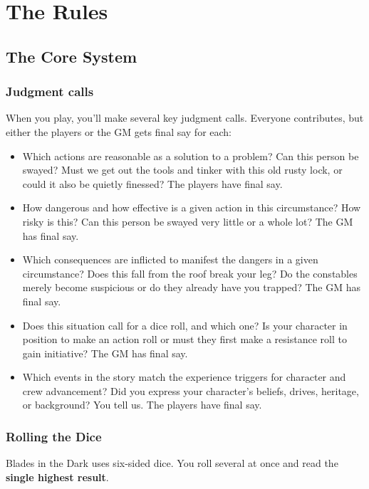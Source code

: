 \chapter{The Rules}

\section{The Core System}

\subsection{Judgment calls}

When you play, you’ll make several key judgment calls. Everyone contributes, but either the players or the GM gets final say for each:

\begin{itemize}
\item Which actions are reasonable as a solution to a problem? Can this person be swayed? Must we get out the tools and tinker with this old rusty lock, or could it also be quietly finessed? The players have final say.
\item How dangerous and how effective is a given action in this circumstance? How risky is this? Can this person be swayed very little or a whole lot? The GM has final say.
\item Which consequences are inflicted to manifest the dangers in a given circumstance? Does this fall from the roof break your leg? Do the constables merely become suspicious or do they already have you trapped? The GM has final say.
\item Does this situation call for a dice roll, and which one? Is your character in position to make an action roll or must they first make a resistance roll to gain initiative? The GM has final say.
\item Which events in the story match the experience triggers for character and crew advancement? Did you express your character’s beliefs, drives, heritage, or background? You tell us. The players have final say.
\end{itemize}

\subsection{Rolling the Dice}

Blades in the Dark uses six-sided dice. You roll several at once and read the \textbf{single highest result}.

